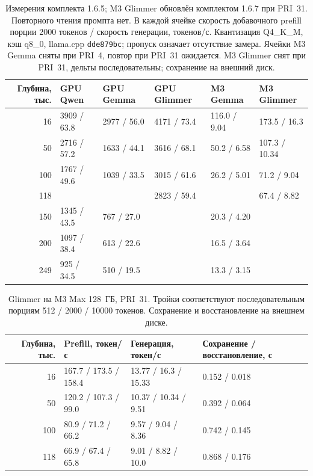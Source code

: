 \begin{table}[t]
\centering
\caption{Измерения комплекта 1.6.5; M3 Glimmer обновлён комплектом 1.6.7 при PRI~31. Повторного чтения промпта нет. В каждой ячейке скорость
добавочного prefill порции 2000 токенов / скорость генерации, токенов/с.
Квантизация Q4\_K\_M, кэш q8\_0, llama.cpp \texttt{dde879bc}; пропуск означает отсутствие замера. Ячейки M3 Gemma сняты при PRI~4, повтор при PRI~31 ожидается. M3 Glimmer снят при PRI~31, дельты последовательны; сохранение на внешний диск.}
\label{tab:swa-measured-methods}
\footnotesize
\begin{tabular}{rlllll}
\toprule
Глубина, тыс. & GPU Qwen & GPU Gemma & GPU Glimmer & M3 Gemma & M3 Glimmer \\
\midrule
16 & 3909 / 63.8 & 2977 / 56.0 & 4171 / 73.4 & 116.0 / 9.04 & 173.5 / 16.3 \\
50 & 2716 / 57.2 & 1633 / 44.1 & 3616 / 68.1 & 50.2 / 6.58 & 107.3 / 10.34 \\
100 & 1767 / 49.6 & 1039 / 33.5 & 3015 / 61.6 & 26.2 / 5.01 & 71.2 / 9.04 \\
118 & & & 2823 / 59.4 & & 67.4 / 8.82 \\
150 & 1345 / 43.5 & 767 / 27.0 & & 20.3 / 4.20 & \\
200 & 1097 / 38.4 & 613 / 22.6 & & 16.5 / 3.64 & \\
249 & 925 / 34.5 & 510 / 19.5 & & 13.3 / 3.15 & \\
\bottomrule
\end{tabular}
\end{table}

\begin{table}[t]
\centering
\caption{Glimmer на M3 Max 128~ГБ, PRI~31. Тройки соответствуют последовательным порциям
512 / 2000 / 10000 токенов. Сохранение и восстановление на внешнем диске.}
\label{tab:glimmer-pri31-methods}
\footnotesize
\begin{tabular}{rlll}
\toprule
Глубина, тыс. & Prefill, токен/с & Генерация, токен/с & Сохранение / восстановление, с \\
\midrule
16 & 167.7 / 173.5 / 158.4 & 13.77 / 16.3 / 15.33 & 0.152 / 0.018 \\
50 & 120.2 / 107.3 / 99.0 & 10.37 / 10.34 / 9.51 & 0.392 / 0.064 \\
100 & 80.9 / 71.2 / 66.2 & 9.57 / 9.04 / 8.36 & 0.742 / 0.145 \\
118 & 66.9 / 67.4 / 65.8 & 9.01 / 8.82 / 10.0 & 0.868 / 0.176 \\
\bottomrule
\end{tabular}
\end{table}

